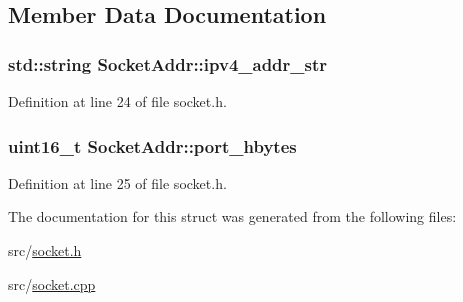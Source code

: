 \subsection{Member Data Documentation}
\subsubsection[{\texorpdfstring{ipv4\+\_\+addr\+\_\+str}{ipv4_addr_str}}]{\setlength{\rightskip}{0pt plus 5cm}std\+::string Socket\+Addr\+::ipv4\+\_\+addr\+\_\+str}\hypertarget{structSocketAddr_a973e725fb7a3fb1e92d97da9e89a1fe1}{}\label{structSocketAddr_a973e725fb7a3fb1e92d97da9e89a1fe1}


Definition at line 24 of file socket.\+h.

\subsubsection[{\texorpdfstring{port\+\_\+hbytes}{port_hbytes}}]{\setlength{\rightskip}{0pt plus 5cm}uint16\+\_\+t Socket\+Addr\+::port\+\_\+hbytes}\hypertarget{structSocketAddr_aabf22ab371acc5bc2de3d32b135a8911}{}\label{structSocketAddr_aabf22ab371acc5bc2de3d32b135a8911}


Definition at line 25 of file socket.\+h.



The documentation for this struct was generated from the following files\+:\begin{DoxyCompactItemize}
\item 
src/\hyperlink{socket_8h}{socket.\+h}\item 
src/\hyperlink{socket_8cpp}{socket.\+cpp}\end{DoxyCompactItemize}
